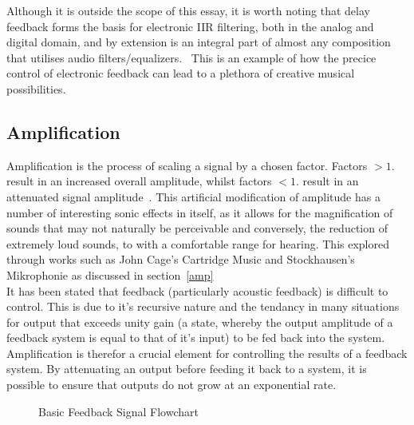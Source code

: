 \documentclass[titlepage]{scrartcl}
\begin{document}
    Although it is outside the scope of this essay, it is worth noting that
    delay feedback forms the basis for electronic IIR filtering, both in the
    analog and digital domain, and by extension is an integral part of almost
    any composition that utilises audio
    filters/equalizers.~\parencite[p.71-72]{zolzer2011dafx} This is an example
    of how the precice control of electronic feedback can lead to a plethora of
    creative musical possibilities.

    \subsection{Amplification}
    Amplification is the process of scaling a signal by a chosen factor.
    Factors $>1.$ result in an increased overall amplitude, whilst factors
    $<1.$ result in an attenuated signal amplitude~\parencite[p.3-4]{kadis2012sosr}. 
    This artificial modification of amplitude has a number of interesting sonic
    effects in itself, as it allows for the magnification of sounds that may not
    naturally be perceivable and conversely, the reduction of extremely loud
    sounds, to with a comfortable range for hearing. This explored through
    works such as John Cage's Cartridge Music and Stockhausen's Mikrophonie as
    discussed in section~\ref{amp}\\

    It has been stated that feedback (particularly acoustic feedback) is
    difficult to control. This is due to it's recursive nature and the tendancy
    in many situations for output that exceeds unity gain (a state, whereby the
    output amplitude of a feedback system is equal to that of it's input) to be
    fed back into the system. Amplification is therefor a crucial element for
    controlling the results of a feedback system. By attenuating an output
    before feeding it back to a system, it is possible to ensure that outputs
    do not grow at an exponential rate.
    \begin{figure}[H]
        \caption[Caption for LOF]{Basic Feedback Signal Flowchart\protect\footnotemark}
        \label{feed_flowchart}
    \end{figure}

\end{document}

